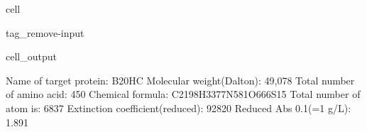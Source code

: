 \documentclass[letterpaper,10pt,english]{jupyterBook}
\begin{document}
\begin{sphinxuseclass}{cell}
\begin{sphinxuseclass}{tag_remove-input}\begin{sphinxVerbatimOutput}

\begin{sphinxuseclass}{cell_output}
\begin{sphinxVerbatim}[commandchars=\\\{\}]
\PYGZsh{} Name of target protein: \PYGZhy{}\PYGZhy{}\PYGZhy{}\PYGZhy{}\PYGZhy{}\PYGZhy{}\PYGZhy{}\PYGZhy{}\PYGZhy{}\PYGZhy{}\PYGZhy{}\PYGZhy{}\PYGZhy{}\PYGZhy{}\PYGZhy{}\PYGZhy{}\PYGZhy{}\PYGZhy{}\PYGZhy{}\PYGZhy{}\PYGZhy{}\PYGZhy{}\PYGZhy{}\PYGZhy{}\PYGZhy{}\PYGZhy{}\PYGZhy{}\PYGZhy{}\PYGZhy{}\PYGZhy{}\PYGZhy{}\PYGZhy{}\PYGZhy{}\PYGZhy{}B20\PYGZus{}HC
\PYGZsh{} Molecular weight(Dalton): \PYGZhy{}\PYGZhy{}\PYGZhy{}\PYGZhy{}\PYGZhy{}\PYGZhy{}\PYGZhy{}\PYGZhy{}\PYGZhy{}\PYGZhy{}\PYGZhy{}\PYGZhy{}\PYGZhy{}\PYGZhy{}\PYGZhy{}\PYGZhy{}\PYGZhy{}\PYGZhy{}\PYGZhy{}\PYGZhy{}\PYGZhy{}\PYGZhy{}\PYGZhy{}\PYGZhy{}\PYGZhy{}\PYGZhy{}\PYGZhy{}\PYGZhy{}\PYGZhy{}\PYGZhy{}\PYGZhy{}\PYGZhy{}49,078
\PYGZsh{} Total number of amino acid: \PYGZhy{}\PYGZhy{}\PYGZhy{}\PYGZhy{}\PYGZhy{}\PYGZhy{}\PYGZhy{}\PYGZhy{}\PYGZhy{}\PYGZhy{}\PYGZhy{}\PYGZhy{}\PYGZhy{}\PYGZhy{}\PYGZhy{}\PYGZhy{}\PYGZhy{}\PYGZhy{}\PYGZhy{}\PYGZhy{}\PYGZhy{}\PYGZhy{}\PYGZhy{}\PYGZhy{}\PYGZhy{}\PYGZhy{}\PYGZhy{}\PYGZhy{}\PYGZhy{}\PYGZhy{}\PYGZhy{}\PYGZhy{}\PYGZhy{}450
\PYGZsh{} Chemical formula: \PYGZhy{}\PYGZhy{}\PYGZhy{}\PYGZhy{}\PYGZhy{}\PYGZhy{}\PYGZhy{}\PYGZhy{}\PYGZhy{}\PYGZhy{}\PYGZhy{}\PYGZhy{}\PYGZhy{}\PYGZhy{}\PYGZhy{}\PYGZhy{}\PYGZhy{}\PYGZhy{}\PYGZhy{}\PYGZhy{}\PYGZhy{}\PYGZhy{}\PYGZhy{}\PYGZhy{}\PYGZhy{}C2198H3377N581O666S15
\PYGZsh{} Total number of atom is: \PYGZhy{}\PYGZhy{}\PYGZhy{}\PYGZhy{}\PYGZhy{}\PYGZhy{}\PYGZhy{}\PYGZhy{}\PYGZhy{}\PYGZhy{}\PYGZhy{}\PYGZhy{}\PYGZhy{}\PYGZhy{}\PYGZhy{}\PYGZhy{}\PYGZhy{}\PYGZhy{}\PYGZhy{}\PYGZhy{}\PYGZhy{}\PYGZhy{}\PYGZhy{}\PYGZhy{}\PYGZhy{}\PYGZhy{}\PYGZhy{}\PYGZhy{}\PYGZhy{}\PYGZhy{}\PYGZhy{}\PYGZhy{}\PYGZhy{}\PYGZhy{}\PYGZhy{}6837
\PYGZsh{} Extinction coefficient(reduced): \PYGZhy{}\PYGZhy{}\PYGZhy{}\PYGZhy{}\PYGZhy{}\PYGZhy{}\PYGZhy{}\PYGZhy{}\PYGZhy{}\PYGZhy{}\PYGZhy{}\PYGZhy{}\PYGZhy{}\PYGZhy{}\PYGZhy{}\PYGZhy{}\PYGZhy{}\PYGZhy{}\PYGZhy{}\PYGZhy{}\PYGZhy{}\PYGZhy{}\PYGZhy{}\PYGZhy{}\PYGZhy{}\PYGZhy{}92820
\PYGZsh{} Reduced Abs 0.1\PYGZpc{}(=1 g/L): \PYGZhy{}\PYGZhy{}\PYGZhy{}\PYGZhy{}\PYGZhy{}\PYGZhy{}\PYGZhy{}\PYGZhy{}\PYGZhy{}\PYGZhy{}\PYGZhy{}\PYGZhy{}\PYGZhy{}\PYGZhy{}\PYGZhy{}\PYGZhy{}\PYGZhy{}\PYGZhy{}\PYGZhy{}\PYGZhy{}\PYGZhy{}\PYGZhy{}\PYGZhy{}\PYGZhy{}\PYGZhy{}\PYGZhy{}\PYGZhy{}\PYGZhy{}\PYGZhy{}\PYGZhy{}\PYGZhy{}\PYGZhy{}\PYGZhy{}1.891

\end{sphinxVerbatim}
\end{sphinxuseclass}
\end{sphinxVerbatimOutput}
\end{sphinxuseclass}
\end{sphinxuseclass}
\end{document}

